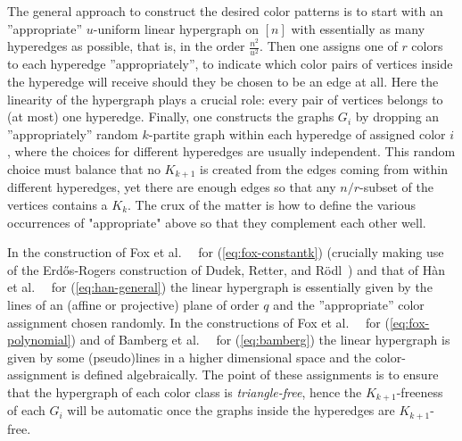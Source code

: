 \documentclass[12pt]{article}
\theoremstyle{definition}
\begin{document}
	
	The general approach to construct the desired color patterns is to start with an ''appropriate'' $u$-uniform linear hypergraph on $[n]$ with essentially as many hyperedges as possible, that is, in the order $\frac{n^2}{u^2}$. Then one assigns one of $r$ colors to each hyperedge ''appropriately'', to indicate which color pairs of vertices inside the hyperedge will receive should they be chosen to be an edge at all. Here the linearity of the hypergraph plays a crucial role: every pair of vertices belongs to (at most) one hyperedge. Finally, one constructs the graphs $G_i$ by dropping an ''appropriately'' random $k$-partite graph within each hyperedge of assigned color $i$, where the choices for different hyperedges are usually independent. 
    This random choice must balance that no $K_{k+1}$ is created from the edges coming from within different hyperedges, yet there are enough edges so that any $n/r$-subset of the vertices contains a $K_k$. The crux of the matter is how to define the various occurrences of "appropriate" above so that they complement each other well.
	
	In the construction of Fox et al.\ ~\cite{fox2016minimum} for (\ref{eq:fox-constantk}) (crucially making use of the Erd\H os-Rogers construction of Dudek, Retter, and R\"odl~\cite{dudek2014generalized})
	and that of H\`an et al.\ ~\cite{han} for (\ref{eq:han-general}) the linear hypergraph is essentially given by the lines of an (affine or projective) plane of order $q$ and the ''appropriate'' color assignment chosen randomly. In the constructions of Fox et al.\ ~\cite{fox2016minimum} for (\ref{eq:fox-polynomial}) and of Bamberg et al.\ ~\cite{bamberg2022minimum} for (\ref{eq:bamberg}) the linear hypergraph is given by some (pseudo)lines in a higher dimensional space and the color-assignment is defined algebraically. The point of these assignments is to ensure that the hypergraph of each color class is {\em triangle-free}, hence the $K_{k+1}$-freeness of each $G_i$ will be automatic once the graphs inside the hyperedges are $K_{k+1}$-free.
	
\end{document}
